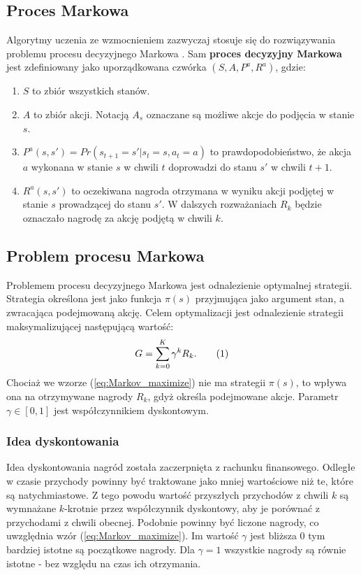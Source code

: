 \documentclass[12pt]{book}
\theoremstyle{plain}
\newcommand\addtag{\refstepcounter{equation}
\renewcommand{\labelenumii}{\theenumii}
\renewcommand{\theenumii}{\theenumi.\arabic{enumii}.}
\tag{\theequation}}
\newcommand{\myref}[1]{(\ref{#1})}
\begin{document}
\subsection*{Proces Markowa}
Algorytmy uczenia ze wzmocnieniem zazwyczaj stosuje się do rozwiązywania problemu procesu decyzyjnego Markowa \cite{reinforcementBook}. Sam \textbf{proces decyzyjny Markowa} jest zdefiniowany jako uporządkowana czwórka $(S,A,P^a,R^a)$, gdzie:
\begin{enumerate}
	\item $S$ to zbiór wszystkich stanów.
	\item $A$ to zbiór akcji. Notacją $A_s$ oznaczane są możliwe akcje do podjęcia w stanie $s$.
	\item $P^a(s,s')=Pr(s_{t+1}=s'|s_t=s,a_t=a)$ to prawdopodobieństwo, że akcja $a$ wykonana w stanie $s$ w chwili $t$ doprowadzi do stanu $s'$ w chwili $t+1$.
	\item $R^a(s,s')$ to oczekiwana nagroda otrzymana w wyniku akcji podjętej w stanie $s$ prowadzącej do stanu $s'$. W dalszych rozważaniach $R_k$ będzie oznaczało nagrodę za akcję podjętą w chwili $k$.
\end{enumerate}
\subsection*{Problem procesu Markowa}
Problemem procesu decyzyjnego Markowa jest odnalezienie optymalnej strategii. Strategia określona jest jako funkcja $\pi(s)$ przyjmująca jako argument stan, a zwracająca podejmowaną akcję. Celem optymalizacji jest odnalezienie strategii maksymalizującej następującą wartość:
\[
G=\sum_{k=0}^{K} \gamma^k R_{k}. \addtag \label{eq:Markov_maximize}
\]
Chociaż we wzorze \myref{eq:Markov_maximize} nie ma strategii $\pi(s)$, to wpływa ona na otrzymywane nagrody $R_{k}$, gdyż określa podejmowane akcje. Parametr $\gamma \in [0,1]$ jest współczynnikiem dyskontowym. 
\subsubsection*{Idea dyskontowania}
Idea dyskontowania nagród została zaczerpnięta z rachunku finansowego. Odległe w czasie przychody powinny być traktowane jako mniej wartościowe niż te, które są natychmiastowe. Z tego powodu wartość przyszłych przychodów z chwili $k$ są wymnażane $k$-krotnie przez współczynnik dyskontowy, aby je porównać z przychodami z chwili obecnej. Podobnie powinny być liczone nagrody, co uwzględnia wzór \myref{eq:Markov_maximize}. Im wartość $\gamma$ jest bliższa 0 tym bardziej istotne są początkowe nagrody. Dla $\gamma=1$ wszystkie nagrody są równie istotne - bez względu na czas ich otrzymania.\\
\end{document}
